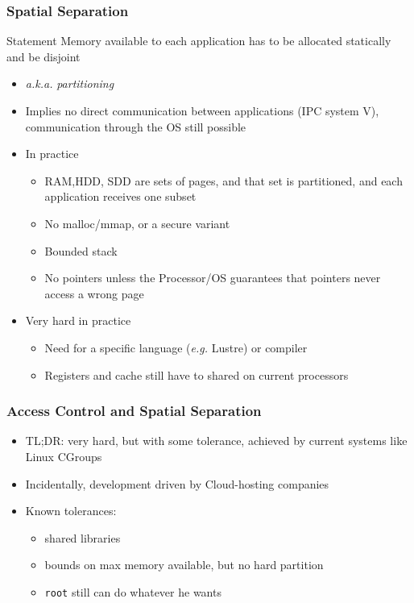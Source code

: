 \begin{reveals}
\begin{frame}
\end{frame}


\begin{frame}
  \frametitle{Spatial Separation}

  \begin{block}{Statement}
    Memory available to each application has to be allocated
    statically and be disjoint
  \end{block}

  \begin{itemize}
  \item \textit{a.k.a.} \emph{partitioning}
  \item Implies no direct communication between applications (IPC
    system V), communication through the OS still possible
  \item In practice
    \begin{itemize}
    \item RAM,HDD, SDD are sets of pages, and that set is partitioned,
      and each application receives one subset
    \item No malloc/mmap, or a secure variant
    \item Bounded stack
    \item No pointers unless the Processor/OS guarantees that pointers
      never access a wrong page
    \end{itemize}
  \item Very hard in practice
    \begin{itemize}
    \item Need for a specific language (\textit{e.g.} Lustre) or compiler
    \item Registers and cache still have to shared on current processors
    \end{itemize}
  \end{itemize}

\end{frame}

\begin{frame}
  \frametitle{Access Control and Spatial Separation}

  \begin{itemize}[<+->]
  \item TL;DR: very hard, but with some tolerance, achieved by current
    systems like Linux CGroups
  \item Incidentally, development driven by Cloud-hosting companies
  \item Known tolerances:
    \begin{itemize}
    \item shared libraries
    \item bounds on max memory available, but no hard partition
    \item \texttt{root} still can do whatever he wants
    \end{itemize}
  \end{itemize}


\end{frame}
\end{reveals}
